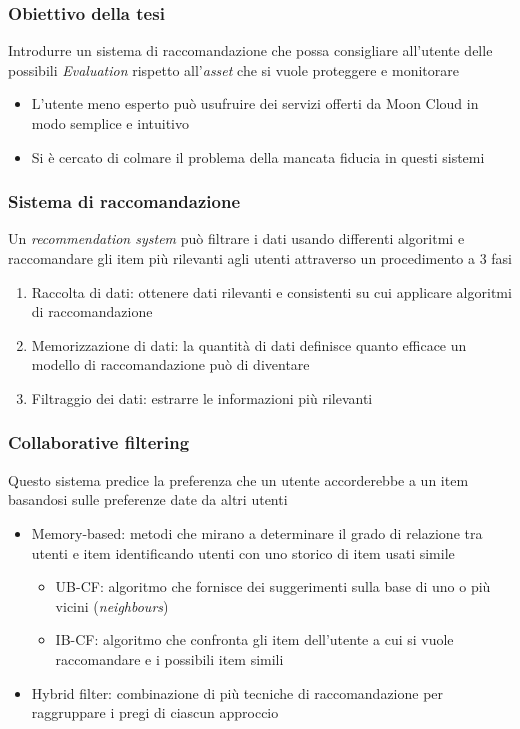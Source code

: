 \begin{frame}
    \frametitle{Obiettivo della tesi}
    Introdurre un \alert{sistema di raccomandazione} che possa consigliare all'utente delle possibili \textit{Evaluation} rispetto 
    all'\textit{asset} che si vuole proteggere e monitorare
    \begin{itemize}
        \item L'utente meno esperto può usufruire dei servizi offerti da Moon Cloud in modo \alert{semplice} e \alert{intuitivo}
        \item Si è cercato di colmare il problema della mancata fiducia in questi sistemi
    \end{itemize}
\end{frame}

\begin{frame}
    \frametitle{Sistema di raccomandazione}
    Un \textit{recommendation system} può filtrare i dati usando differenti algoritmi e raccomandare gli item più rilevanti agli utenti attraverso 
    un procedimento a 3 fasi
    \begin{enumerate}
        \item \alert{Raccolta di dati}: ottenere dati rilevanti e consistenti su cui applicare algoritmi di raccomandazione
        \item \alert{Memorizzazione di dati}: la quantità di dati definisce quanto efficace un modello di raccomandazione può di diventare
        \item \alert{Filtraggio dei dati}: estrarre le informazioni più rilevanti
    \end{enumerate}
\end{frame}

\begin{frame}
    \frametitle{Collaborative filtering}
    Questo sistema predice la preferenza che un utente accorderebbe a un item basandosi sulle preferenze date da altri utenti
    \begin{itemize}
        \item Memory-based: metodi che mirano a determinare il grado di relazione tra utenti e item identificando 
        utenti con uno storico di item usati simile
            \begin{itemize}
                \item \alert{UB-CF}: algoritmo che fornisce dei suggerimenti sulla base di uno o più vicini (\textit{neighbours})
                \item \alert{IB-CF}: algoritmo che confronta gli item dell'utente a cui si vuole raccomandare e i possibili item simili
            \end{itemize}
        \item Hybrid filter: combinazione di più tecniche di raccomandazione per raggruppare i pregi di ciascun approccio
    \end{itemize}
\end{frame}

